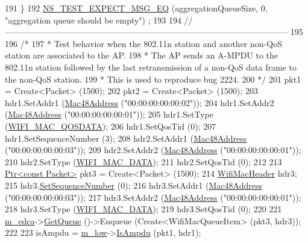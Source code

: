 \begin{DoxyCode}
191     \}
192   \hyperlink{group__testing_ga7304ba46a28d8cf08dfdfd6499cf7068}{NS\_TEST\_EXPECT\_MSG\_EQ} (aggregationQueueSize, 0, \textcolor{stringliteral}{"aggregation queue should be empty"})
      ;
193 
194   \textcolor{comment}{//-----------------------------------------------------------------------------------------------------}
195 
196   \textcolor{comment}{/*}
197 \textcolor{comment}{   * Test behavior when the 802.11n station and another non-QoS station are associated to the AP.}
198 \textcolor{comment}{   * The AP sends an A-MPDU to the 802.11n station followed by the last retransmission of a non-QoS data
       frame to the non-QoS station.}
199 \textcolor{comment}{   * This is used to reproduce bug 2224.}
200 \textcolor{comment}{   */}
201   pkt1 = Create<Packet> (1500);
202   pkt2 = Create<Packet> (1500);
203   hdr1.SetAddr1 (\hyperlink{classns3_1_1Mac48Address}{Mac48Address} (\textcolor{stringliteral}{"00:00:00:00:00:02"}));
204   hdr1.SetAddr2 (\hyperlink{classns3_1_1Mac48Address}{Mac48Address} (\textcolor{stringliteral}{"00:00:00:00:00:01"}));
205   hdr1.SetType (\hyperlink{namespacens3_a9318472db39b35b2092de5c721e6ab0aafd37aea1ac3edba5410fac6367b19b1d}{WIFI\_MAC\_QOSDATA});
206   hdr1.SetQosTid (0);
207   hdr1.SetSequenceNumber (3);
208   hdr2.SetAddr1 (\hyperlink{classns3_1_1Mac48Address}{Mac48Address} (\textcolor{stringliteral}{"00:00:00:00:00:03"}));
209   hdr2.SetAddr2 (\hyperlink{classns3_1_1Mac48Address}{Mac48Address} (\textcolor{stringliteral}{"00:00:00:00:00:01"}));
210   hdr2.SetType (\hyperlink{namespacens3_a9318472db39b35b2092de5c721e6ab0aaf7067a476d424f297c26441fa1a515df}{WIFI\_MAC\_DATA});
211   hdr2.SetQosTid (0);
212 
213   \hyperlink{classns3_1_1Ptr}{Ptr<const Packet>} pkt3 = Create<Packet> (1500);
214   \hyperlink{classns3_1_1WifiMacHeader}{WifiMacHeader} hdr3;
215   hdr3.\hyperlink{classns3_1_1WifiMacHeader_a51634924960a25606596916eabdcc12e}{SetSequenceNumber} (0);
216   hdr3.SetAddr1 (\hyperlink{classns3_1_1Mac48Address}{Mac48Address} (\textcolor{stringliteral}{"00:00:00:00:00:03"}));
217   hdr3.SetAddr2 (\hyperlink{classns3_1_1Mac48Address}{Mac48Address} (\textcolor{stringliteral}{"00:00:00:00:00:01"}));
218   hdr3.SetType (\hyperlink{namespacens3_a9318472db39b35b2092de5c721e6ab0aaf7067a476d424f297c26441fa1a515df}{WIFI\_MAC\_DATA});
219   hdr3.SetQosTid (0);
220 
221   \hyperlink{classAmpduAggregationTest_aa073b38b49ac92944de917cd25fe46f4}{m\_edca}->\hyperlink{classns3_1_1DcaTxop_a6c89d0aeccbc5e8724d404bc45f796d7}{GetQueue} ()->Enqueue (Create<WifiMacQueueItem> (pkt3, hdr3));
222 
223   isAmpdu = \hyperlink{classAmpduAggregationTest_a65f2d8fbd8b46a92ace2c371d2a091d9}{m\_low}->\hyperlink{classns3_1_1MacLow_a228f675a7db0df0e39edb611167861cc}{IsAmpdu} (pkt1, hdr1);

\end{DoxyCode}
